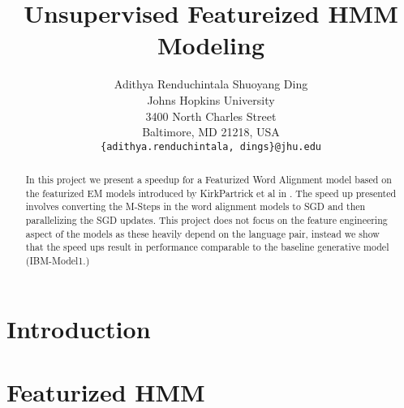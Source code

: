 \documentclass[11pt,letterpaper]{article}
\title{Unsupervised Featureized HMM Modeling}
\author{Adithya Renduchintala
  \quad\quad Shuoyang Ding\\
  Johns Hopkins University\\
  3400 North Charles Street\\
  Baltimore, MD 21218, USA\\
  {\tt \{adithya.renduchintala, dings\}@jhu.edu}}
\date{}
\begin{document}
\maketitle
\begin{abstract}
In this project we present a speedup for a Featurized Word Alignment model based on the featurized EM models introduced by KirkPartrick et al in \cite{berg2010painless}. The speed up presented involves converting the M-Steps in the word alignment models to SGD and then parallelizing the SGD updates. This project does not focus on the feature engineering aspect of the models as these heavily depend on the language pair, instead we show that the speed ups result in performance comparable to the baseline generative model (IBM-Model1.)
\end{abstract}

\section{Introduction}
\cite{brown1993mathematics}
\cite{vogel1996hmm}
\cite{berg2010painless}
\cite{baum1970maximization}

\section{Featurized HMM}
\end{document}
